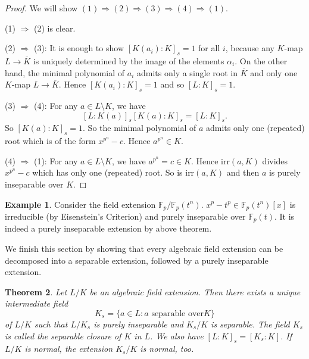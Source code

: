 \documentclass[12pt]{report}
\newtheorem{thm}{Theorem}[section]
\theoremstyle{definition}
\newtheorem{example}[thm]{Example}
\def\FF{\mathbb{F}}
\def\aa{\alpha}
\def\irr{\text{irr}}
\begin{document}
\begin{proof} 
    We will show $(1)\Longrightarrow (2) \Longrightarrow (3) \Longrightarrow (4) \Longrightarrow (1)$.


    (1) $\Longrightarrow$ (2) is clear.


    (2) $\Longrightarrow$ (3):  It is enough to show $[K(a_i):K]_s=1$ for all $i$, because any $K$-map $L\to \overline{K}$ is uniquely determined by the image of the elements $\aa_i$. On the other hand, the minimal polynomial of $a_i$ admits only a single root in $\overline{K}$ and only one $K$-map $L\to \overline{K}$. Hence $[K(a_i):K]_s=1$ and so $[L:K]_s=1$.
    
    
    (3) $\Longrightarrow$ (4): For any $a\in L\setminus K$, we have $$[L:K(a)]_s [K(a):K]_s = [L:K]_s.$$ So $[K(a):K]_s=1$. So the minimal polynomial of $a$ admits only one (repeated) root which is of the form $x^{p^n}-c$. Hence $a^{p^n}\in K$.


    (4) $\Longrightarrow$ (1):  For any $a\in L\setminus K$, we have $a^{p^n}=c\in K$. Hence $\irr(a,K)$ divides $x^{p^n}-c$ which has only one (repeated) root. So is $\irr(a,K)$ and then $a$ is purely inseparable over $K$.
\end{proof}

\begin{example}
    Consider the field extension $\FF_p/\FF_p(t^n)$. $x^p-t^p\in \FF_p(t^n)[x]$ is irreducible (by Eisenstein's Criterion) and purely inseparable over $\FF_p(t)$. It is indeed a purely inseparable extension by above theorem. 
\end{example}

We finish this section by showing that every algebraic field extension can be decomposed into a separable extension, followed by a purely inseparable extension. 

\begin{thm}
    Let $L/K$ be an algebraic field extension. Then there exists a unique intermediate field $$K_s=\{a\in L:a \mbox{ separable over} K\}$$ of $L/K$ such that $L/K_s$ is purely inseparable and $K_s/K$ is separable. The field $K_s$ is called the separable closure of $K$ in $L$. We also have  $[L : K]_s = [K_s : K]$. If $L/K$ is normal, the extension $K_s/K$ is normal, too.
\end{thm}
\end{document}
